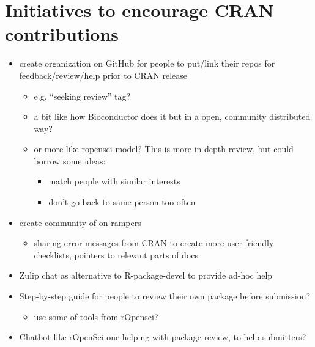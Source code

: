 \documentclass[]{book}
\providecommand{\tightlist}{%
  \setlength{\itemsep}{0pt}\setlength{\parskip}{0pt}}
\begin{document}
\hypertarget{initiatives-to-encourage-cran-contributions}{%
\chapter{Initiatives to encourage CRAN contributions}\label{initiatives-to-encourage-cran-contributions}}

\begin{itemize}
\tightlist
\item
  create organization on GitHub for people to put/link their repos for feedback/review/help prior to CRAN release

  \begin{itemize}
  \tightlist
  \item
    e.g. ``seeking review'' tag?
  \item
    a bit like how Bioconductor does it but in a open, community distributed way?
  \item
    or more like ropensci model? This is more in-depth review, but could borrow some ideas:

    \begin{itemize}
    \tightlist
    \item
      match people with similar interests
    \item
      don't go back to same person too often
    \end{itemize}
  \end{itemize}
\item
  create community of on-rampers

  \begin{itemize}
  \tightlist
  \item
    sharing error messages from CRAN to create more user-friendly checklists, pointers to relevant parts of docs
  \end{itemize}
\item
  Zulip chat as alternative to R-package-devel to provide ad-hoc help
\item
  Step-by-step guide for people to review their own package before submission?

  \begin{itemize}
  \tightlist
  \item
    use some of tools from rOpensci?
  \end{itemize}
\item
  Chatbot like rOpenSci one helping with package review, to help submitters?
\end{itemize}


\end{document}
